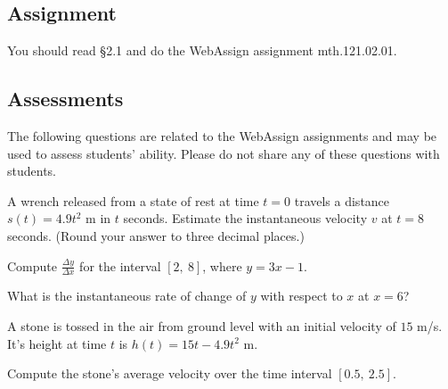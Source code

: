 \documentclass[12pt,addpoints, answers, fleqn]{exam}
\begin{document}
\subsection{Assignment}
You should read \S  2.1 and do the WebAssign assignment mth.121.02.01.
\vfill
\pagebreak
\begin{teacher}
\subsection{Assessments}
The following questions are related to the WebAssign assignments and may be used to assess students' ability. Please do not share any of these questions with students.
\begin{questions}		
\question 	%

A wrench released from a state of rest at time $t = 0$ travels a distance $s\left( t \right) = 4.9t^2$ m in $t$ seconds. Estimate the instantaneous velocity $v$ at $t = 8$ seconds. (Round your answer to three decimal places.)

\begin{solution}
\end{solution}

\question 	%

Compute $\displaystyle \frac{\Delta y}{\Delta x}$  for the interval $\left[2,\ 8\right]$, where $y = 3x - 1$.

\begin{solution}
\end{solution}


What is the instantaneous rate of change of $y$ with respect to $x$ at 
$x = 6$?


\begin{solution}
\end{solution}

\question 	%

A stone is tossed in the air from ground level with an initial velocity of $15$ m/s. It's height at time $t$ is 
$h\left(t\right) = 15t - 4.9t^2$ m.


Compute the stone's average velocity over the time interval $\left[0.5, \ 2.5 \right]$.
\begin{solution}
\end{solution}


\end{questions}
\end{teacher}
\end{document}
